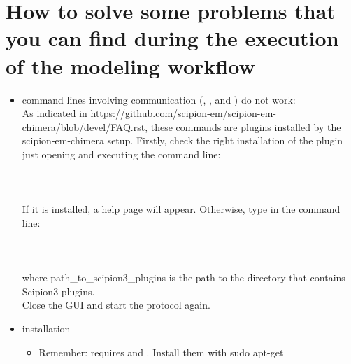 \section{How to solve some problems that you can find during the execution of the modeling workflow}
\label{problems}

\begin{itemize}
 
 \item \chimera command lines involving \scipion communication (, ,  and ) do not work:\\
 As indicated in \url{https://github.com/scipion-em/scipion-em-chimera/blob/devel/FAQ.rst}, these commands are \chimera plugins installed by the scipion-em-chimera setup. Firstly, check the right installation of the plugin just opening \chimera and executing the command line:\\ 
 \\ 
 \\ 
 \\If it is installed, a help page will appear. Otherwise, type in the command line:\\
 \\ 
 \\ 
 \\
 where path\_to\_scipion3\_plugins is the path to the directory that contains Scipion3 plugins.\\
 Close the \chimera GUI and start the protocol again.

 \item {} installation
        \begin{itemize}
        \item Remember:  requires  and . Install them with sudo apt-get
        \end{itemize}

 
\end{itemize}
